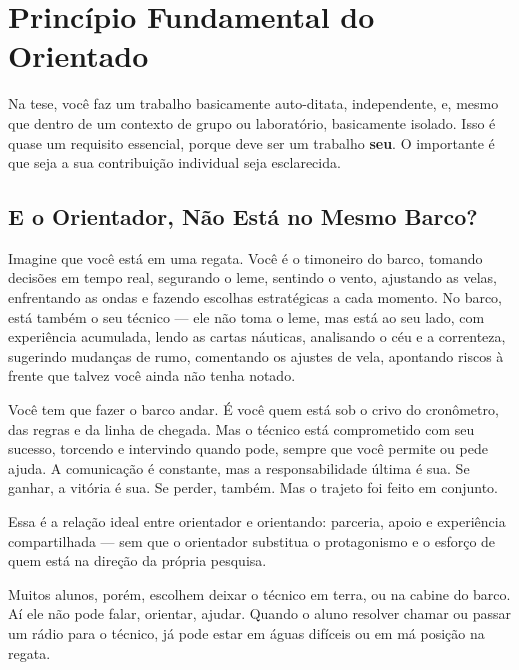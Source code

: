 \chapter{Princípio Fundamental do Orientado}
\label{chap:pfo}



Na tese, você faz um trabalho basicamente auto-ditata, independente, e, mesmo que dentro de um contexto de grupo ou laboratório, basicamente isolado. Isso é quase um requisito essencial, porque deve ser um trabalho \textbf{seu}. O importante é que seja a sua contribuição individual seja esclarecida.




\section{E o Orientador, Não Está no Mesmo Barco?}

Imagine que você está em uma regata. Você é o timoneiro do barco, tomando decisões em tempo real, segurando o leme, sentindo o vento, ajustando as velas, enfrentando as ondas e fazendo escolhas estratégicas a cada momento. 
No barco, está também o seu técnico — ele não toma o leme, mas está ao seu lado, com experiência acumulada, lendo as cartas náuticas, analisando o céu e a correnteza, sugerindo mudanças de rumo, comentando os ajustes de vela, apontando riscos à frente que talvez você ainda não tenha notado.

Você tem que fazer o barco andar. É você quem está sob o crivo do cronômetro, das regras e da linha de chegada. 
Mas o técnico está comprometido com seu sucesso, torcendo e intervindo quando pode, sempre que você permite ou pede ajuda. A comunicação é constante, mas a responsabilidade última é sua. Se ganhar, a vitória é sua. Se perder, também. Mas o trajeto foi feito em conjunto.

Essa é a relação ideal entre orientador e orientando: parceria, apoio e experiência compartilhada — sem que o orientador substitua o protagonismo e o esforço de quem está na direção da própria pesquisa.

Muitos alunos, porém, escolhem deixar o técnico em terra, ou na cabine do barco. Aí ele não pode falar, orientar, ajudar. Quando o aluno resolver chamar ou passar um rádio para o técnico, já pode estar em águas difíceis ou em má posição na regata. 

